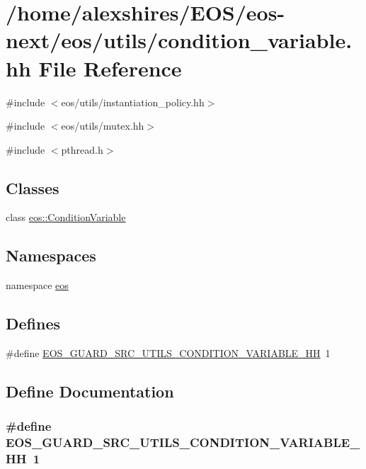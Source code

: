 \hypertarget{condition__variable_8hh}{
\section{/home/alexshires/EOS/eos-\/next/eos/utils/condition\_\-variable.hh File Reference}
\label{condition__variable_8hh}
}
{\ttfamily \#include $<$eos/utils/instantiation\_\-policy.hh$>$}\par
{\ttfamily \#include $<$eos/utils/mutex.hh$>$}\par
{\ttfamily \#include $<$pthread.h$>$}\par
\subsection*{Classes}
\begin{DoxyCompactItemize}
\item 
class \hyperlink{classeos_1_1ConditionVariable}{eos::ConditionVariable}
\end{DoxyCompactItemize}
\subsection*{Namespaces}
\begin{DoxyCompactItemize}
\item 
namespace \hyperlink{namespaceeos}{eos}
\end{DoxyCompactItemize}
\subsection*{Defines}
\begin{DoxyCompactItemize}
\item 
\#define \hyperlink{condition__variable_8hh_af003c450e5342b76fc2bc1b26acb445d}{EOS\_\-GUARD\_\-SRC\_\-UTILS\_\-CONDITION\_\-VARIABLE\_\-HH}~1
\end{DoxyCompactItemize}


\subsection{Define Documentation}
\hypertarget{condition__variable_8hh_af003c450e5342b76fc2bc1b26acb445d}{
\subsubsection[{EOS\_\-GUARD\_\-SRC\_\-UTILS\_\-CONDITION\_\-VARIABLE\_\-HH}]{\setlength{\rightskip}{0pt plus 5cm}\#define EOS\_\-GUARD\_\-SRC\_\-UTILS\_\-CONDITION\_\-VARIABLE\_\-HH~1}}
\label{condition__variable_8hh_af003c450e5342b76fc2bc1b26acb445d}
